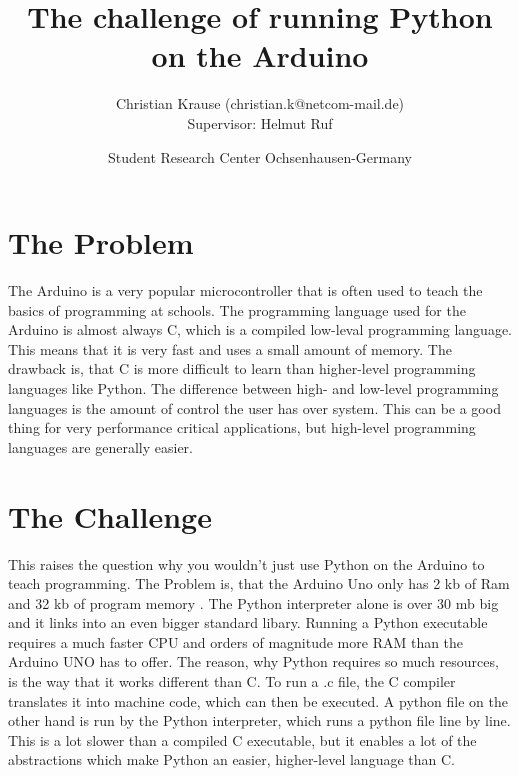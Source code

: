\documentclass{article}
\title{The challenge of running Python on the Arduino}
\author{Christian Krause \small(christian.k@netcom-mail.de)\\[0.1cm]{\small Supervisor: Helmut Ruf}}
\date{\small Student Research Center Ochsenhausen-Germany}
\begin{document}
\maketitle
\begin{multicols}{2}
\section{The Problem}
\noindent The Arduino is a very popular microcontroller that is often used to teach the basics of programming at schools. The programming language used for the Arduino is almost always C, which is a compiled low-leval programming language. This means that it is very fast and uses a small amount of memory. The drawback is, that C is more difficult to learn than higher-level programming languages like Python. The difference between high- and low-level programming languages is the amount of control the user has over system. This can be a good thing for very performance critical applications, but high-level programming languages are generally easier.%

\section{The Challenge}
\noindent This raises the question why you wouldn't just use Python on the Arduino to teach programming. The Problem is, that the Arduino Uno only has 2 kb of Ram and 32 kb of program memory \cite{Q1}. The Python interpreter alone is over 30 mb big and it links into an even bigger standard libary. Running a Python executable requires a much faster CPU and orders of magnitude more RAM than the Arduino UNO has to offer. %
The reason, why Python requires so much resources, is the way that it works different than C. To run a .c file, the C compiler translates it into machine code, which can then be executed. A python file on the other hand is run by the Python interpreter, which runs a python file line by line. This is a lot slower than a compiled C executable, but it enables a lot of the abstractions which make Python an easier, higher-level language than C.


\end{multicols}
\end{document}
